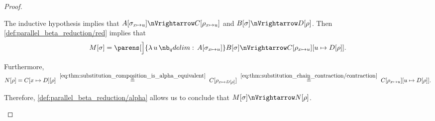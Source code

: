 \begin{proof}
\begin{itemize}
    The inductive hypothesis implies that \( A[\sigma_{x \mapsto u}] \pred C[\rho_{x \mapsto u}] \) and \( B[\sigma] \pred D[\rho] \). Then \ref{def:parallel_beta_reduction/red} implies that
    \begin{equation*}
      M[\sigma]
      =
      \parens[\Big]{ \qabs u A[\sigma_{x \mapsto u}] } B[\sigma]
      \pred
      C[\rho_{x \mapsto u}][u \mapsto D[\rho]].
    \end{equation*}

    Furthermore,
    \begin{equation*}
      N[\rho]
      =
      C[x \mapsto D][\rho]
      \reloset {\eqref{eq:thm:substitution_composition_is_alpha_equivalent}} \aequiv
      C[\rho_{x \mapsto D[\rho]}]
      \reloset {\eqref{eq:thm:substitution_chain_contraction/contraction}} \aequiv
      C[\rho_{x \mapsto u}][u \mapsto D[\rho]].
    \end{equation*}

    Therefore, \ref{def:parallel_beta_reduction/alpha} allows us to conclude that \( M[\sigma] \pred N[\rho] \).
  \end{itemize}
\end{proof}

